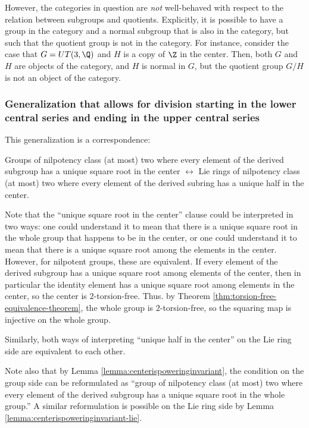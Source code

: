 \documentclass{ucetd}
\begin{document}
However, the categories in question are {\em not} well-behaved with
respect to the relation between subgroups and quotients. Explicitly,
it is possible to have a group in the category and a normal subgroup
that is also in the category, but such that the quotient group is not
in the category. For instance, consider the case that $G = UT(3,\Q)$
and $H$ is a copy of $\Z$ in the center. Then, both $G$ and $H$ are
objects of the category, and $H$ is normal in $G$, but the quotient
group $G/H$ is not an object of the category.

\subsubsection{Generalization that allows for division starting in the lower central series and ending in the upper central series}\label{sec:baer-correspondence-lucs-generalization}

This generalization is a correspondence:

Groups of nilpotency class (at most) two where every element of the
derived subgroup has a unique square root in the center
$\leftrightarrow$ Lie rings of nilpotency class (at most) two where
every element of the derived subring has a unique half in the center.

Note that the ``unique square root in the center'' clause could be
interpreted in two ways: one could understand it to mean that there is
a unique square root in the whole group that happens to be in the
center, or one could understand it to mean that there is a unique
square root among the elements in the center. However, for nilpotent
groups, these are equivalent. If every element of the derived subgroup
has a unique square root among elements of the center, then in
particular the identity element has a unique square root among
elements in the center, so the center is $2$-torsion-free. Thus. by
Theorem \ref{thm:torsion-free-equivalence-theorem}, the whole group is
$2$-torsion-free, so the squaring map is injective on the whole group.

Similarly, both ways of interpreting ``unique half in the center'' on
the Lie ring side are equivalent to each other.

Note also that by Lemma \ref{lemma:centerispoweringinvariant}, the
condition on the group side can be reformulated as ``group of
nilpotency class (at most) two where every element of the derived
subgroup has a unique square root in the whole group.'' A similar
reformulation is possible on the Lie ring side by Lemma
\ref{lemma:centerispoweringinvariant-lie}.
\end{document}
